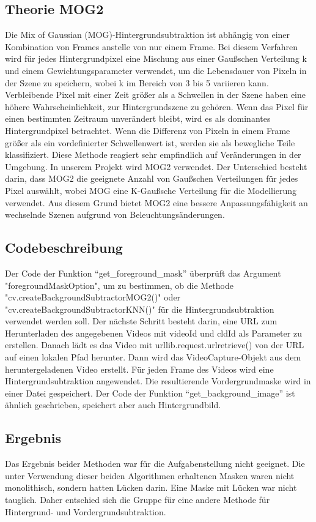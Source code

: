 \documentclass[12pt]{scrartcl}
\begin{document}
\subsection{Theorie MOG2}
Die Mix of Gaussian (MOG)-Hintergrundsubtraktion ist abh\"angig von einer Kombination von Frames anstelle von nur einem Frame. Bei diesem Verfahren wird f\"ur jedes Hintergrundpixel eine Mischung aus einer Gau{\ss}schen Verteilung k und einem Gewichtungsparameter verwendet, um die Lebensdauer von Pixeln in der Szene zu speichern, wobei k im Bereich von 3 bis 5 variieren kann. Verbleibende Pixel mit einer Zeit gr\"o{\ss}er als a Schwellen in der Szene haben eine h\"ohere Wahrscheinlichkeit, zur Hintergrundszene zu geh\"oren. Wenn das Pixel f\"ur einen bestimmten Zeitraum unver\"andert bleibt, wird es als dominantes Hintergrundpixel betrachtet. Wenn die Differenz von Pixeln in einem Frame gr\"o{\ss}er als ein vordefinierter Schwellenwert ist, werden sie als bewegliche Teile klassifiziert. Diese Methode reagiert sehr empfindlich auf Ver\"anderungen in der Umgebung.
In unserem Projekt wird MOG2 verwendet. Der Unterschied besteht darin, dass MOG2 die geeignete Anzahl von Gau{\ss}schen Verteilungen f\"ur jedes Pixel ausw\"ahlt, wobei MOG eine K-Gau{\ss}sche Verteilung f\"ur die Modellierung verwendet. Aus diesem Grund bietet MOG2 eine bessere Anpassungsf\"ahigkeit an wechselnde Szenen aufgrund von Beleuchtungs\"anderungen.
\subsection{Codebeschreibung}
Der Code der Funktion “get_foreground_mask” \"uberpr\"uft das Argument "foregroundMaskOption", um zu bestimmen, ob die Methode "cv.createBackgroundSubtractorMOG2()" oder "cv.createBackgroundSubtractorKNN()" f\"ur die Hintergrundsubtraktion verwendet werden soll. Der n\"achste Schritt besteht darin, eine URL zum Herunterladen des angegebenen Videos mit videoId und cldId als Parameter zu erstellen. Danach l\"adt es das Video mit urllib.request.urlretrieve() von der URL auf einen lokalen Pfad herunter. Dann wird das VideoCapture-Objekt aus dem heruntergeladenen Video erstellt. F\"ur jeden Frame des Videos wird eine Hintergrundsubtraktion angewendet. Die resultierende Vordergrundmaske wird in einer Datei gespeichert.
Der Code der Funktion “get_background_image” ist \"ahnlich geschrieben, speichert aber auch Hintergrundbild.\\
\subsection{Ergebnis}
Das Ergebnis beider Methoden war f\"ur die Aufgabenstellung nicht geeignet. Die unter Verwendung dieser beiden Algorithmen erhaltenen Masken waren nicht monolithisch, sondern hatten L\"ucken darin. Eine Maske mit L\"ucken war nicht tauglich.
Daher entschied sich die Gruppe f\"ur eine andere Methode f\"ur Hintergrund- und Vordergrundsubtraktion.\\
\end{document}
